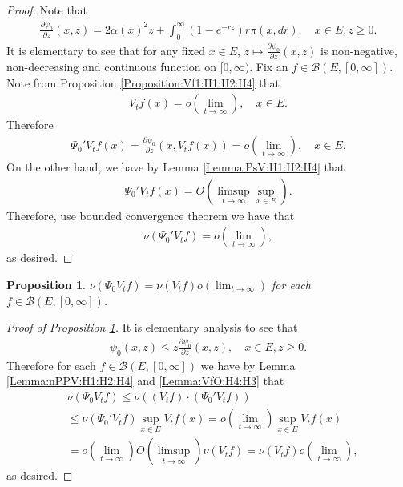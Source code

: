 \documentclass[12pt,a4paper]{amsart}
\numberwithin{equation}{section}
\theoremstyle{plain}
\newtheorem{prop}[thm]{Proposition}
\theoremstyle{definition}
\theoremstyle{remark}
\begin{document}
\begin{proof}
Note that 
\begin{align}
 \frac{\partial \psi_0 }{ \partial z} (x,z)
 = 2\alpha (x)^2 z + \int_0^\infty (1 - e^{- rz}) r \pi(x,dr), 
 \quad x\in E, z\geq 0.
  \end{align}
It is elementary to see that for any fixed $x\in E$, $z\mapsto \frac{\partial \psi_0}{\partial z} (x,z)$ is non-negative, non-decreasing and continuous function on $[0,\infty)$. 
Fix an $f\in \mathcal B(E,[0,\infty])$. 
Note from Proposition \ref{Proposition:Vf1:H1:H2:H4} that 
\begin{align}
  V_tf(x) 
  = o(\lim_{t\to \infty}),
\quad x\in E.
  \end{align}
Therefore 
\begin{align}
 \Psi_0' V_tf(x) 
 =\frac{\partial \psi_0}{ \partial z}(x,V_tf(x)) 
 = o(\lim_{t\to \infty}),
\quad x\in E.
 \end{align}
On the other hand, we have by Lemma \ref{Lemma:PsV:H1:H2:H4} that
\begin{align}
  \Psi_0'V_t f(x) 
  = O(\limsup_{t\to \infty}\sup_{x\in E}).
  \end{align} 
Therefore, use bounded convergence theorem we have that 
\begin{align}
  \nu(\Psi_0' V_tf) 
  = o(\lim_{t\to \infty}),
  \end{align}
as desired.
\end{proof}
\begin{prop} \label{Proposition:nP:H1:H2:H3:H4} 
$\nu(\Psi_0 V_t f) = \nu(V_tf) o(\lim_{t\to \infty})$ for each $f\in \mathcal B(E,[0,\infty])$.
\end{prop}
\begin{proof}[{Proof of Proposition \ref{Proposition:nP:H1:H2:H3:H4}}]
It is elementary analysis to see that 
\begin{align}
  \psi_0(x,z) 
  \leq z \frac{\partial \psi_0}{\partial z}(x,z),
  \quad x\in E, z\geq 0.
  \end{align}
Therefore for each $f\in \mathcal B(E,[0,\infty])$ we have by Lemma \ref{Lemma:nPPV:H1:H2:H4} and \ref{Lemma:VfO:H4:H3} that 
\begin{align}
  &\nu(\Psi_0 V_tf) 
\leq \nu((V_tf)\cdot (\Psi_0' V_tf))
\\&  \leq \nu(\Psi_0' V_tf) \sup_{x\in E} V_tf(x)
  = o(\lim_{t\to \infty}) \sup_{x\in E} V_tf(x)
  \\&= o(\lim_{t\to \infty}) O(\limsup_{t\to \infty}) \nu(V_tf)
  = \nu(V_tf) o(\lim_{t\to \infty}),
  \end{align}
as desired.
\end{proof}
\end{document}
